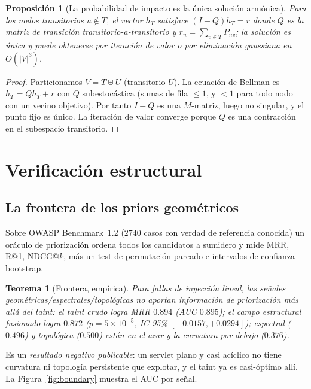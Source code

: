 \documentclass[journal]{IEEEtran}
\newtheorem{theorem}{Teorema}
\newtheorem{proposition}{Proposición}
\begin{document}
\begin{proposition}[La probabilidad de impacto es la única solución armónica]
\label{prop:hit}
Para los nodos transitorios $u\notin T$, el vector $h_T$ satisface $(I-Q)h_T=r$
donde $Q$ es la matriz de transición transitorio-a-transitorio y
$r_u=\sum_{v\in T}P_{uv}$; la solución es única y puede obtenerse por iteración de
valor o por eliminación gaussiana en $O(|V|^3)$.
\end{proposition}
\begin{proof}
Particionamos $V=T\uplus U$ (transitorio $U$). La ecuación de Bellman es
$h_T=Qh_T+r$ con $Q$ subestocástica (sumas de fila $\le1$, y $<1$ para todo nodo
con un vecino objetivo). Por tanto $I-Q$ es una $M$-matriz, luego no singular, y el
punto fijo es único. La iteración de valor converge porque $Q$ es una contracción
en el subespacio transitorio. \qedhere
\end{proof}

\section{Verificación estructural}
\label{sec:verification}

\subsection{La frontera de los priors geométricos}
\label{sec:boundary}
Sobre OWASP Benchmark~1.2 \cite{owasp2015} ($2740$ casos con verdad de referencia
conocida) un oráculo de priorización ordena todos los candidatos a sumidero y mide
MRR, R@1, NDCG@$k$, más un test de permutación pareado e intervalos de confianza
bootstrap.

\begin{theorem}[Frontera, empírica]
\label{thm:boundary}
Para fallas de inyección lineal, las señales geométricas/espectrales/topológicas
no aportan información de priorización más allá del taint: el taint crudo logra MRR
$0.894$ (AUC $0.895$); el campo estructural fusionado logra $0.872$
($p=5\times10^{-5}$, IC 95\% $[+0.0157,+0.0294]$); espectral ($0.496$) y
topológica ($0.500$) están en el azar y la curvatura por debajo ($0.376$).
\end{theorem}

Es un \emph{resultado negativo publicable}: un servlet plano y casi acíclico no
tiene curvatura ni topología persistente que explotar, y el taint ya es
casi-óptimo allí. La Figura~\ref{fig:boundary} muestra el AUC por señal.
\end{document}
